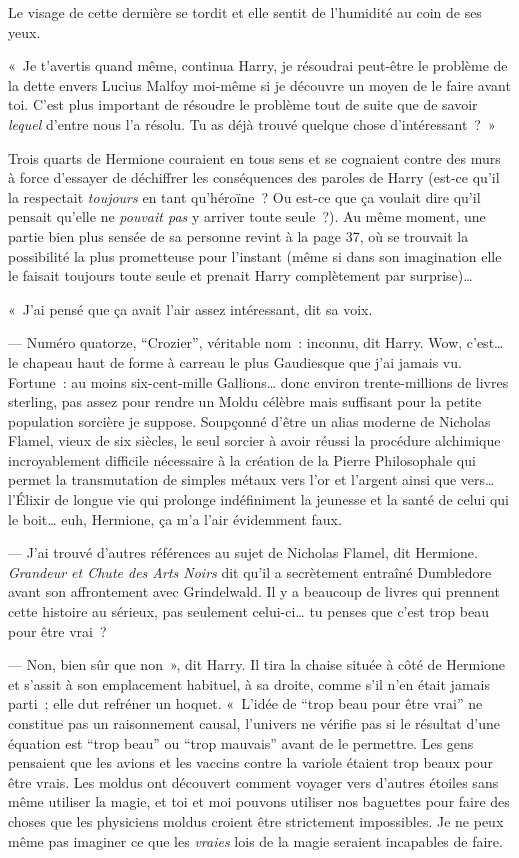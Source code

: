 Le visage de cette dernière se tordit et elle sentit de l'humidité au coin de ses yeux.

«~Je t'avertis quand même, continua Harry, je résoudrai peut-être le problème de la dette envers Lucius Malfoy moi-même si je découvre un moyen de le faire avant toi.
C'est plus important de résoudre le problème tout de suite que de savoir \emph{lequel} d'entre nous l'a résolu.
Tu as déjà trouvé quelque chose d'intéressant~?~»

Trois quarts de Hermione couraient en tous sens et se cognaient contre des murs à force d'essayer de déchiffrer les conséquences des paroles de Harry (est-ce qu'il la respectait \emph{toujours} en tant qu'héroïne~?
Ou est-ce que ça voulait dire qu'il pensait qu'elle ne \emph{pouvait pas} y arriver toute seule~?).
Au même moment, une partie bien plus sensée de sa personne revint à la page 37, où se trouvait la possibilité la plus prometteuse pour l'instant (même si dans son imagination elle le faisait toujours toute seule et prenait Harry complètement par surprise)…

«~J'ai pensé que ça avait l'air assez intéressant, dit sa voix.

--- Numéro quatorze, “Crozier”, véritable nom~: inconnu, dit Harry.
Wow, c'est… le chapeau haut de forme à carreau le plus Gaudiesque que j'ai jamais vu.
Fortune~: au moins six-cent-mille Gallions… donc environ trente-millions de livres sterling, pas assez pour rendre un Moldu célèbre mais suffisant pour la petite population sorcière je suppose.
Soupçonné d'être un alias moderne de Nicholas Flamel, vieux de six siècles, le seul sorcier à avoir réussi la procédure alchimique incroyablement difficile nécessaire à la création de la Pierre Philosophale qui permet la transmutation de simples métaux vers l'or et l'argent ainsi que vers… l'Élixir de longue vie qui prolonge indéfiniment la jeunesse et la santé de celui qui le boit… euh, Hermione, ça m'a l'air évidemment faux.

--- J'ai trouvé d'autres références au sujet de Nicholas Flamel, dit Hermione.
\emph{Grandeur et Chute des Arts Noirs} dit qu'il a secrètement entraîné Dumbledore avant son affrontement avec Grindelwald.
Il y a beaucoup de livres qui prennent cette histoire au sérieux, pas seulement celui-ci… tu penses que c'est trop beau pour être vrai~?

--- Non, bien sûr que non~», dit Harry.
Il tira la chaise située à côté de Hermione et s'assit à son emplacement habituel, à sa droite, comme s'il n'en était jamais parti~; elle dut refréner un hoquet.
«~L'idée de “trop beau pour être vrai” ne constitue pas un raisonnement causal, l'univers ne vérifie pas si le résultat d'une équation est “trop beau” ou “trop mauvais” avant de le permettre.
Les gens pensaient que les avions et les vaccins contre la variole étaient trop beaux pour être vrais.
Les moldus ont découvert comment voyager vers d'autres étoiles sans même utiliser la magie, et toi et moi pouvons utiliser nos baguettes pour faire des choses que les physiciens moldus croient être strictement impossibles.
Je ne peux même pas imaginer ce que les \emph{vraies} lois de la magie seraient incapables de faire.

